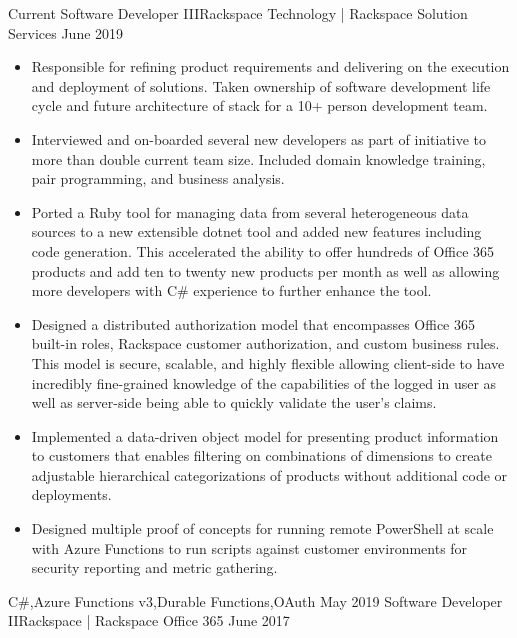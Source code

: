 \begin{experiences}
  \experience
    {Current}       {Software Developer III}{Rackspace Technology | Rackspace Solution Services}
    {June 2019}     {
                      \begin{itemize}
                        \item Responsible for refining product requirements and delivering on the execution and deployment of solutions. Taken ownership of software development life cycle and future architecture of stack for a 10+ person development team.
                        \item Interviewed and on-boarded several new developers as part of initiative to more than double current team size. Included domain knowledge training, pair programming, and business analysis.
                        \item Ported a Ruby tool for managing data from several heterogeneous data sources to a new extensible dotnet tool and added new features including code generation. This accelerated the ability to offer hundreds of Office 365 products and add ten to twenty new products per month as well as allowing more developers with C\# experience to further enhance the tool.
                        \item Designed a distributed authorization model that encompasses Office 365 built-in roles, Rackspace customer authorization, and custom business rules. This model is secure, scalable, and highly flexible allowing client-side to have incredibly fine-grained knowledge of the capabilities of the logged in user as well as server-side being able to quickly validate the user's claims.
                        \item Implemented a data-driven object model for presenting product information to customers that enables filtering on combinations of dimensions to create adjustable hierarchical categorizations of products without additional code or deployments.
                        \item Designed multiple proof of concepts for running remote PowerShell at scale with Azure Functions to run scripts against customer environments for security reporting and metric gathering.
                      \end{itemize}
                    }
                    {C\#,Azure Functions v3,Durable Functions,OAuth}
  \emptySeparator
  \experience
    {May 2019}     {Software Developer II}{Rackspace | Rackspace Office 365}
    {June 2017}    {
}
\end{experiences}
